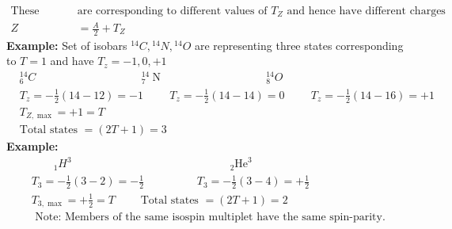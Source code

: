 \begin{enumerate}
\begin{align*}
\text{These states }&\text{are  corresponding to different values of $T_Z$ and hence have different charges}\\
Z&=\frac{A}{2}+T_Z
\end{align*}
\textbf{Example:} Set of isobars ${ }^{14} C,{ }^{14} N,{ }^{14} O$ are representing three states corresponding to $T=1$ and have $T_z=-1,0,+1$
\begin{align*}
&{ }_6^{14} C\hspace{4cm}{ }_7^{14} \mathrm{~N}\hspace{4cm}{ }_8^{14} O\\
&T_z=-\frac{1}{2}(14-12)=-1 \hspace{1cm} T_z=-\frac{1}{2}(14-14)=0 \hspace{1cm} T_z=-\frac{1}{2}(14-16)=+1\\
&T_{Z, \max }=+1=T\\
&\text{Total states }=(2 T+1)=3
\end{align*}
\textbf{Example:}
\begin{align*}
&\qquad{ }_1 H^3 \hspace{6cm} { }_2 \mathrm{He}^3\\
&T_3=-\frac{1}{2}(3-2)=-\frac{1}{2} \hspace{2cm}T_3=-\frac{1}{2}(3-4)=+\frac{1}{2}\\
&T_{3, \max }=+\frac{1}{2}=T \qquad \text { Total states }=(2 T+1)=2\\
&\text { Note: Members of the same isospin multiplet have the same spin-parity. }
\end{align*}
\end{enumerate}
